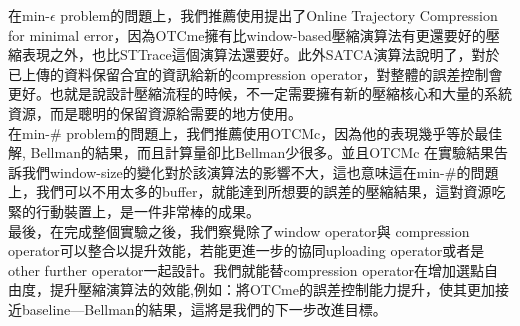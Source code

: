 \documentclass[12pt]{article}
\begin{document}
\begin{CJK}{UTF8}{bsmi}
在min-$\epsilon$ problem的問題上，我們推薦使用提出了Online Trajectory Compression for minimal error，因為OTCme擁有比window-based壓縮演算法有更還要好的壓縮表現之外，也比STTrace這個演算法還要好。此外SATCA演算法說明了，對於已上傳的資料保留合宜的資訊給新的compression operator，對整體的誤差控制會更好。也就是說設計壓縮流程的時候，不一定需要擁有新的壓縮核心和大量的系統資源，而是聰明的保留資源給需要的地方使用。\\

在min-\# problem的問題上，我們推薦使用OTCMc，因為他的表現幾乎等於最佳解, Bellman的結果，而且計算量卻比Bellman少很多。並且OTCMc 在實驗結果告訴我們window-size的變化對於該演算法的影響不大，這也意味這在min-\#的問題上，我們可以不用太多的buffer，就能達到所想要的誤差的壓縮結果，這對資源吃緊的行動裝置上，是一件非常棒的成果。\\


最後，在完成整個實驗之後，我們察覺除了window operator與 compression operator可以整合以提升效能，若能更進一步的協同uploading operator或者是other further operator一起設計。我們就能替compression operator在增加選點自由度，提升壓縮演算法的效能,例如：將OTCme的誤差控制能力提升，使其更加接近baseline—Bellman的結果，這將是我們的下一步改進目標。


	
	
\end{CJK} 
\end{document}
